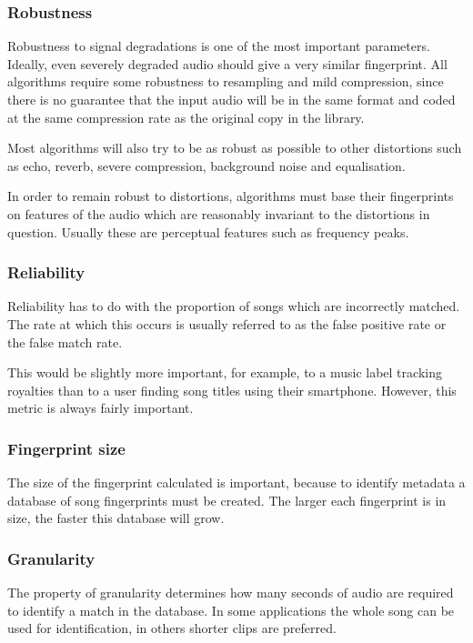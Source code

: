 \documentclass[12pt,a4paper,twoside,openright]{report}
\begin{document}
\subsubsection{Robustness}

Robustness to signal degradations is one of the most important parameters. Ideally, even severely degraded audio should give a very similar fingerprint. All algorithms require some robustness to resampling and mild compression, since there is no guarantee that the input audio will be in the same format and coded at the same compression rate as the original copy in the library.

Most algorithms will also try to be as robust as possible to other distortions such as echo, reverb, severe compression, background noise and equalisation.

In order to remain robust to distortions, algorithms must base their fingerprints on features of the audio which are reasonably invariant to the distortions in question. Usually these are perceptual features such as frequency peaks.

\subsubsection{Reliability}

Reliability has to do with the proportion of songs which are incorrectly matched. The rate at which this occurs is usually referred to as the false positive rate or the false match rate.

This would be slightly more important, for example, to a music label tracking royalties than to a user finding song titles using their smartphone. However, this metric is always fairly important.

\subsubsection{Fingerprint size}

The size of the fingerprint calculated is important, because to identify metadata a database of song fingerprints must be created. The larger each fingerprint is in size, the faster this database will grow.

\subsubsection{Granularity}

The property of granularity determines how many seconds of audio are required to identify a match in the database. In some applications the whole song can be used for identification, in others shorter clips are preferred. 
\end{document}
